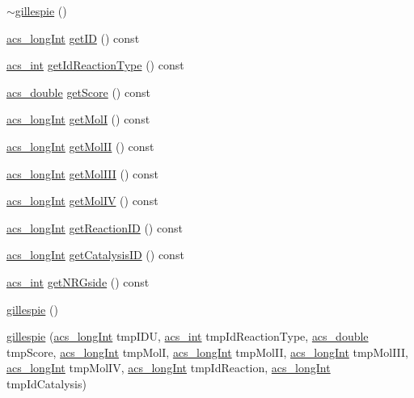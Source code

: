 \begin{DoxyCompactItemize}
\item 
\hyperlink{a00015_a33a97651932d8f82d82d164c94a2eae7}{$\sim$gillespie} ()
\item 
\hyperlink{a00050_a19319d75f02db4308bc5c0026d98cd85}{acs\-\_\-long\-Int} \hyperlink{a00015_a6aba3b283efc955bd4869f663ab877d6}{get\-I\-D} () const 
\item 
\hyperlink{a00050_a8d277355641a098190360234e2ebde35}{acs\-\_\-int} \hyperlink{a00015_a25d1e86363cdd7fabbb624b85620d1db}{get\-Id\-Reaction\-Type} () const 
\item 
\hyperlink{a00050_ab776853a005fcbf56af0424a2a4dd607}{acs\-\_\-double} \hyperlink{a00015_aa0ba52c30f6172a034e3b29afd074106}{get\-Score} () const 
\item 
\hyperlink{a00050_a19319d75f02db4308bc5c0026d98cd85}{acs\-\_\-long\-Int} \hyperlink{a00015_a8de52ad4b41daa64e69c897541b69629}{get\-Mol\-I} () const 
\item 
\hyperlink{a00050_a19319d75f02db4308bc5c0026d98cd85}{acs\-\_\-long\-Int} \hyperlink{a00015_a842457bf58d6af34b992a2c3fe27e4f6}{get\-Mol\-I\-I} () const 
\item 
\hyperlink{a00050_a19319d75f02db4308bc5c0026d98cd85}{acs\-\_\-long\-Int} \hyperlink{a00015_ab3d608ab2016a5a06408a76a1d12aabf}{get\-Mol\-I\-I\-I} () const 
\item 
\hyperlink{a00050_a19319d75f02db4308bc5c0026d98cd85}{acs\-\_\-long\-Int} \hyperlink{a00015_a01e1fb80634ae8fd32ce20fd7b5181ba}{get\-Mol\-I\-V} () const 
\item 
\hyperlink{a00050_a19319d75f02db4308bc5c0026d98cd85}{acs\-\_\-long\-Int} \hyperlink{a00015_a8d4daffecd91b32fb59a94eae6de8d0e}{get\-Reaction\-I\-D} () const 
\item 
\hyperlink{a00050_a19319d75f02db4308bc5c0026d98cd85}{acs\-\_\-long\-Int} \hyperlink{a00015_a0f2202c3d3662ce7cec6b127f066f715}{get\-Catalysis\-I\-D} () const 
\item 
\hyperlink{a00050_a8d277355641a098190360234e2ebde35}{acs\-\_\-int} \hyperlink{a00015_ad668afc14941b6842c703046a1a2d4c1}{get\-N\-R\-Gside} () const 
\item 
\hyperlink{a00015_a1487279f0440557a26662ff6356b8c17}{gillespie} ()
\item 
\hyperlink{a00015_af763c24d6107109108d32b5cc21c116a}{gillespie} (\hyperlink{a00050_a19319d75f02db4308bc5c0026d98cd85}{acs\-\_\-long\-Int} tmp\-I\-D\-U, \hyperlink{a00050_a8d277355641a098190360234e2ebde35}{acs\-\_\-int} tmp\-Id\-Reaction\-Type, \hyperlink{a00050_ab776853a005fcbf56af0424a2a4dd607}{acs\-\_\-double} tmp\-Score, \hyperlink{a00050_a19319d75f02db4308bc5c0026d98cd85}{acs\-\_\-long\-Int} tmp\-Mol\-I, \hyperlink{a00050_a19319d75f02db4308bc5c0026d98cd85}{acs\-\_\-long\-Int} tmp\-Mol\-I\-I, \hyperlink{a00050_a19319d75f02db4308bc5c0026d98cd85}{acs\-\_\-long\-Int} tmp\-Mol\-I\-I\-I, \hyperlink{a00050_a19319d75f02db4308bc5c0026d98cd85}{acs\-\_\-long\-Int} tmp\-Mol\-I\-V, \hyperlink{a00050_a19319d75f02db4308bc5c0026d98cd85}{acs\-\_\-long\-Int} tmp\-Id\-Reaction, \hyperlink{a00050_a19319d75f02db4308bc5c0026d98cd85}{acs\-\_\-long\-Int} tmp\-Id\-Catalysis)

\end{DoxyCompactItemize}
